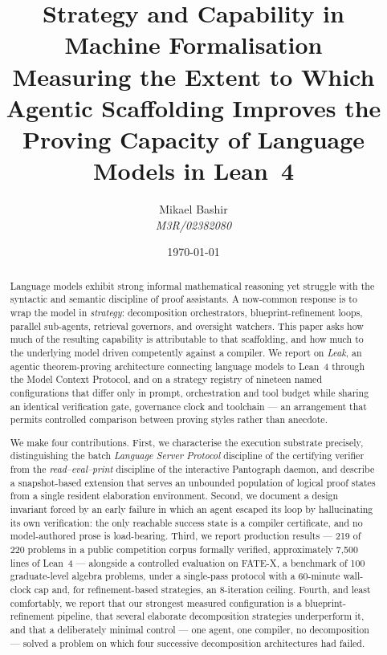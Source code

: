 \documentclass[12pt, a4paper]{article}
\begin{document}
\title{\textbf{Strategy and Capability in Machine Formalisation \\
\large Measuring the Extent to Which Agentic Scaffolding Improves the
Proving Capacity of Language Models in Lean~4}}
\author{Mikael Bashir \\ \textit{M3R/02382080}}
\date{\today}

\maketitle

\begin{abstract}
\noindent
Language models exhibit strong informal mathematical reasoning yet struggle
with the syntactic and semantic discipline of proof assistants. A now-common
response is to wrap the model in \emph{strategy}: decomposition
orchestrators, blueprint-refinement loops, parallel sub-agents, retrieval
governors, and oversight watchers. This paper asks how much of the resulting
capability is attributable to that scaffolding, and how much to the
underlying model driven competently against a compiler. We report on
\emph{Leak}, an agentic theorem-proving architecture connecting language
models to Lean~4 through the Model Context Protocol, and on a strategy
registry of nineteen named configurations that differ only in prompt,
orchestration and tool budget while sharing an identical verification gate,
governance clock and toolchain --- an arrangement that permits controlled
comparison between proving styles rather than anecdote.

We make four contributions. First, we characterise the execution substrate
precisely, distinguishing the batch \emph{Language Server Protocol} discipline
of the certifying verifier from the \emph{read--eval--print} discipline of the
interactive Pantograph daemon, and describe a snapshot-based extension that
serves an unbounded population of logical proof states from a single resident
elaboration environment. Second, we document a design invariant forced by an
early failure in which an agent escaped its loop by hallucinating its own
verification: the only reachable success state is a compiler certificate, and
no model-authored prose is load-bearing. Third, we report production results
--- 219 of 220 problems in a public competition corpus formally verified,
approximately 7{,}500 lines of Lean~4 --- alongside a controlled evaluation on
FATE-X, a benchmark of 100 graduate-level algebra problems, under a
single-pass protocol with a 60-minute wall-clock cap and, for
refinement-based strategies, an 8-iteration ceiling. Fourth, and least
comfortably, we report that our strongest measured configuration is a
blueprint-refinement pipeline, that several elaborate decomposition
strategies underperform it, and that a deliberately minimal control --- one
agent, one compiler, no decomposition --- solved a problem on which four
successive decomposition architectures had failed.


\end{abstract}
\end{document}
